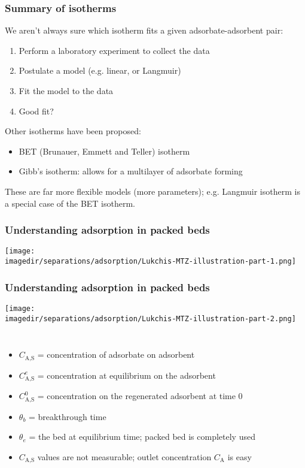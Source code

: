 \begin{frame}\frametitle{Summary of isotherms}
	We aren't always sure which isotherm fits a given adsorbate-adsorbent pair:
	\begin{enumerate}
		\item	Perform a laboratory experiment to collect the data
		\item	Postulate a model (e.g. linear, or Langmuir)
		\item	Fit the model to the data
		\item	Good fit?
	\end{enumerate}

	\vspace{24pt}
	Other isotherms have been proposed:
	\begin{itemize}
		\item	BET (Brunauer, Emmett and Teller) isotherm
		\item	Gibb's isotherm: allows for a multilayer of adsorbate forming
	\end{itemize}

	These are far more flexible models (more parameters); e.g. Langmuir isotherm is a special case of the BET isotherm.
\end{frame}

\begin{frame}\frametitle{Understanding adsorption in packed beds}
	\begin{center}
		\texttt{[image: \\imagedir/separations/adsorption/Lukchis-MTZ-illustration-part-1.png]}
	\end{center}
\end{frame}

\begin{frame}\frametitle{Understanding adsorption in packed beds}
	\begin{center}
		\texttt{[image: \\imagedir/separations/adsorption/Lukchis-MTZ-illustration-part-2.png]}
	\end{center}
	\vspace{-16pt}
	\vspace{-18pt}
	\begin{columns}[t]
			\begin{itemize}
				\item	{\small $C_\text{A,S}$ = concentration of adsorbate on adsorbent}
				\item	{\small $C_\text{A,S}^e$ = concentration at equilibrium on the adsorbent}
				\item	{\small $C_\text{A,S}^0$ = concentration on the regenerated adsorbent at time 0}
				\item	{\small $\theta_b$ = breakthrough time}
				\item	{\small $\theta_e$ = the bed at equilibrium time; packed bed is completely used}
				\item	{\small $C_\text{A,S}$ values are not measurable; outlet concentration $C_\text{A}$ is easy}
			\end{itemize}
	\end{columns}
\end{frame}

